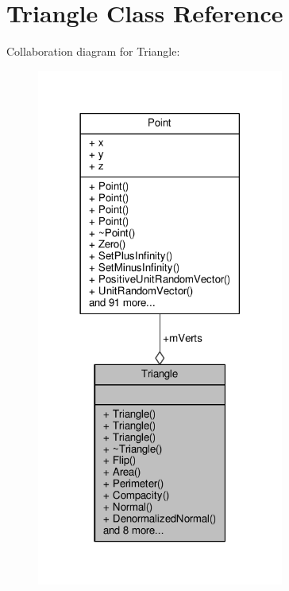 \hypertarget{classTriangle}{}\section{Triangle Class Reference}
\label{classTriangle}


Collaboration diagram for Triangle\+:
\nopagebreak
\begin{figure}[H]
\begin{center}
\leavevmode
\includegraphics[width=230pt]{da/d98/classTriangle__coll__graph}
\end{center}
\end{figure}
